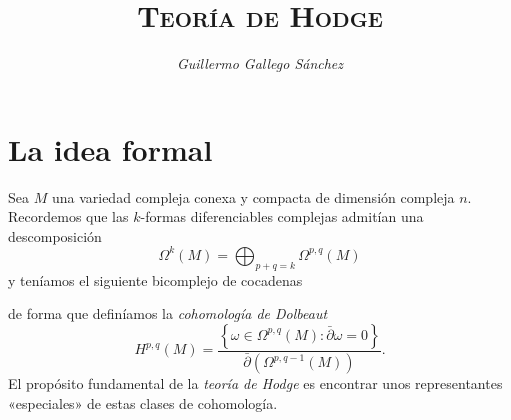 \documentclass[12pt,a4paper]{article}
\author{\textit{Guillermo Gallego Sánchez}}
\title{\textsc{Teoría de Hodge}}
\date{}
\theoremstyle{definition} \newtheorem{defn}[thm]{Definición}
\theoremstyle{definition} \newtheorem{ejemplo}[thm]{Ejemplo}
\theoremstyle{definition} \newtheorem{ejercicio}[thm]{Ejercicio}
\theoremstyle{remark} \newtheorem*{obs}{Observación}
\begin{document}
\maketitle
\section{La idea formal}
Sea $M$ una variedad compleja conexa y compacta de dimensión compleja $n$. Recordemos que las $k$-formas diferenciables complejas admitían una descomposición
\begin{equation*}
  \Omega^k(M)=\bigoplus_{p+q=k}\Omega^{p,q}(M)
\end{equation*}
y teníamos el siguiente bicomplejo de cocadenas
\begin{center}
\end{center}
de forma que definíamos la \emph{cohomología de Dolbeaut}
\begin{equation*}
  H^{p,q}(M)=\frac{\left\{  \omega \in \Omega^{p,q}(M) : \bar{\partial}\omega=0\right\}}{\bar{\partial}(\Omega^{p,q-1}(M))}.
\end{equation*}
El propósito fundamental de la \emph{teoría de Hodge} es encontrar unos representantes «especiales» de estas clases de cohomología.
  
\end{document}

